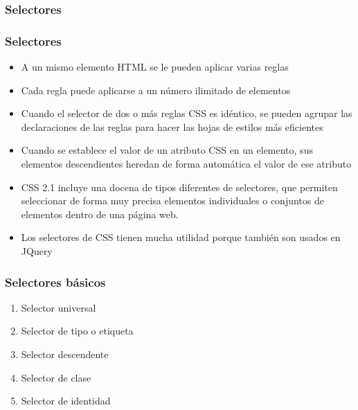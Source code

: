 \documentclass[ucs]{beamer}
\begin{document}

\subsubsection*{Selectores}

\begin{frame}
\frametitle{Selectores}

\begin{itemize}
  \item A un mismo elemento HTML se le pueden aplicar varias reglas 
  \item Cada regla puede aplicarse a un número ilimitado de elementos
  \item Cuando el selector de dos o más reglas CSS es idéntico, se pueden agrupar las declaraciones de las reglas para hacer las hojas de estilos más eficientes
  \item Cuando se establece el valor de un atributo CSS en un elemento, sus elementos descendientes heredan de forma automática el valor de ese atributo
\end{itemize}



\end{frame}

\begin{frame}[fragile]


    \begin{itemize}
    \item
CSS 2.1 incluye una docena de tipos diferentes de selectores, que permiten seleccionar de forma muy precisa elementos individuales o conjuntos de elementos dentro de una página web.

    \item
Los selectores de CSS tienen mucha utilidad porque también son usados en JQuery
    \end{itemize}
\end{frame}


\begin{frame}
\frametitle{Selectores básicos}

\begin{enumerate}
  \item Selector universal
  \item Selector de tipo o etiqueta
  \item Selector descendente
  \item Selector de clase
  \item Selector de identidad
\end{enumerate}

\end{frame}
\end{document}
